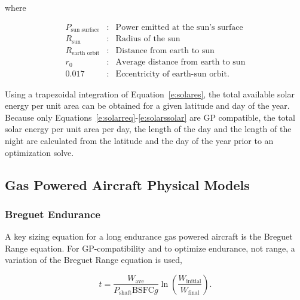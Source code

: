     where 

    \[ \begin{array}{lcl}
        P_{\text{sun surface}} & : & \text{Power emitted at the sun's surface} \\
        R_{\text{sun}} & : & \text{Radius of the sun} \\
        R_{\text{earth orbit}} & : & \text{Distance from earth to sun} \\
        r_0 & : & \text{Average distance from earth to sun} \\
        0.017 & : & \text{Eccentricity of earth-sun orbit}.
    \end{array} \]

    Using a trapezoidal integration of Equation~\eqref{e:solares}, the total available solar energy per unit area can be obtained for a given latitude and day of the year. Because only Equations~\eqref{e:solarreq}-\eqref{e:solarssolar} are GP compatible, the total solar energy per unit area per day, the length of the day and the length of the night are calculated from the latitude and the day of the year prior to an optimization solve.

\subsection{Gas Powered Aircraft Physical Models}

\subsubsection{Breguet Endurance}

A key sizing equation for a long endurance gas powered aircraft is the Breguet Range equation.  
For GP-compatibility and to optimize endurance, not range, a variation of the Breguet Range equation is used, 

\begin{equation}
    \label{e:breguetendurance}
    t = \frac{W_{\text{ave}}}{P_{\text{shaft}}\text{BSFC}g} \ln{\left( \frac{W_{\text{initial}}}{W_{\text{final}}}\right)}.
\end{equation}

%
% 
% 
% 
% 

